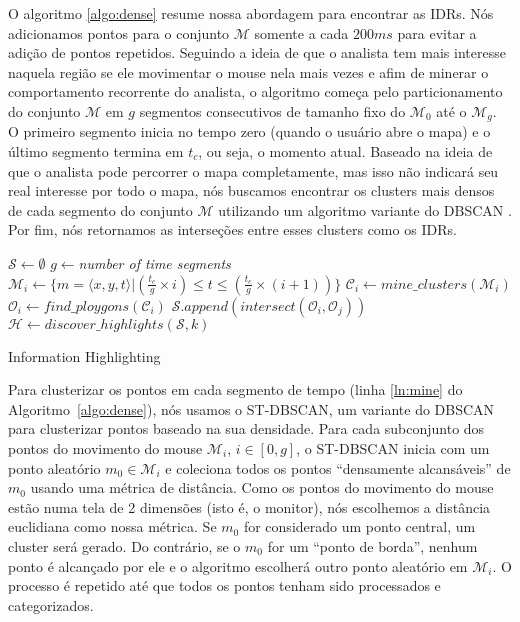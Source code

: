 O algoritmo \ref{algo:dense} resume nossa abordagem para encontrar as IDRs. Nós adicionamos pontos para o conjunto $\mathcal{M}$ somente a cada $200ms$ para evitar a adição de pontos repetidos. Seguindo a ideia de que o analista tem mais interesse naquela região se ele movimentar o mouse nela mais vezes e afim de minerar o comportamento recorrente do analista, o algoritmo começa pelo particionamento do conjunto $\mathcal{M}$ em $g$ segmentos consecutivos de tamanho fixo do $\mathcal{M}_0$ até o $\mathcal{M}_g$. O primeiro segmento inicia no tempo zero (quando o usuário abre o mapa) e o último segmento termina em $t_c$, ou seja, o momento atual. Baseado na ideia de que o analista pode percorrer o mapa completamente, mas isso não indicará seu real interesse por todo o mapa, nós buscamos encontrar os clusters mais densos de cada segmento do conjunto $\mathcal{M}$ utilizando um algoritmo variante do DBSCAN \cite{Ester:1996:DAD:3001460.3001507}. Por fim, nós retornamos as interseções entre esses clusters como os IDRs.


\begin{algorithm}[t]
\DontPrintSemicolon
{}
$\mathcal{S} \gets \emptyset$\;
$g \gets ${\em number of time segments}\;
{
       $\mathcal{M}_i \gets \{m = \langle x,y,t \rangle | (\frac{t_c}{g} \times i) \leq t \leq (\frac{t_c}{g} \times (i+1))\}$\;
       $\mathcal{C}_i \gets \mathit{mine\_clusters}(\mathcal{M}_i)$\label{ln:mine}\;
       $\mathcal{O}_i \gets \mathit{find\_ploygons}(\mathcal{C}_i)$\label{ln:poly}\;
}
{
       $\mathcal{S}.\mathit{append}(\mathit{intersect}(\mathcal{O}_i, \mathcal{O}_j))$
}
$\mathcal{H} \gets \mathit{discover\_highlights}(\mathcal{S},k)$\label{ln:geoguide}\;
\; 
\caption{Information Highlighting}
\label{algo:dense}
\end{algorithm}

Para clusterizar os pontos em cada segmento de tempo (linha \ref{ln:mine} do Algoritmo~\ref{algo:dense}), nós usamos o ST-DBSCAN, um variante do DBSCAN para clusterizar pontos baseado na sua densidade. Para cada subconjunto dos pontos do movimento do mouse $\mathcal{M}_i$, $i \in [0,g]$, o ST-DBSCAN inicia com um ponto aleatório $m_0 \in \mathcal{M}_i$ e coleciona todos os pontos ``densamente alcansáveis'' de $m_0$ usando uma métrica de distância. Como os pontos do movimento do mouse estão numa tela de 2 dimensões (isto é, o monitor), nós escolhemos a distância euclidiana como nossa métrica. Se $m_0$ for considerado um ponto central,  um cluster será gerado. Do contrário, se o $m_0$ for um ``ponto de borda'', nenhum ponto é alcançado por ele e o algoritmo escolherá outro ponto aleatório em $\mathcal{M}_i$. O processo é repetido até que todos os pontos tenham sido processados e categorizados.


